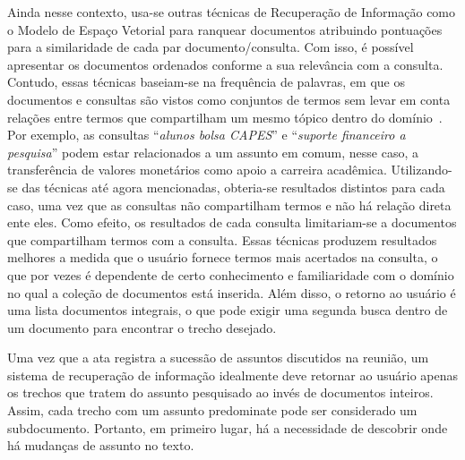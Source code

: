 Ainda nesse contexto, usa-se outras técnicas de Recuperação de Informação como o Modelo de Espaço Vetorial para ranquear documentos atribuindo pontuações para a similaridade de cada par documento/consulta. Com isso, é possível apresentar os documentos ordenados conforme a sua relevância com a consulta. 
%
Contudo, essas técnicas baseiam-se na frequência de palavras, em que os documentos e consultas são vistos como conjuntos de termos sem levar em conta relações entre termos que compartilham um mesmo tópico dentro do domínio~\cite{WEIXING}. Por exemplo, as consultas ``\textit{alunos bolsa CAPES}'' e ``\textit{suporte financeiro a pesquisa}'' podem estar relacionados a um assunto em comum,
nesse caso, a transferência de valores monetários como apoio a carreira acadêmica.
Utilizando-se das técnicas até agora mencionadas, obteria-se resultados distintos para cada caso, uma vez que as consultas não compartilham termos e não há relação direta ente eles. Como efeito, os resultados de cada consulta limitariam-se a documentos que compartilham termos com a consulta.
Essas técnicas produzem resultados melhores a medida que o usuário fornece termos mais acertados na consulta, o que por vezes é dependente de certo conhecimento e familiaridade com o domínio no qual a coleção de documentos está inserida. 
% 
Além disso, o retorno ao usuário é uma lista documentos integrais, o que pode exigir uma segunda busca dentro de um documento para encontrar o trecho desejado.





% 
% 
Uma vez que a ata registra a sucessão de assuntos discutidos na reunião, um sistema de recuperação de informação idealmente deve retornar ao usuário apenas os trechos que tratem do assunto pesquisado ao invés de documentos inteiros. Assim, cada trecho com um assunto predominate pode ser considerado um subdocumento. Portanto, em primeiro lugar, há a necessidade de descobrir onde há mudanças de assunto no texto. 


